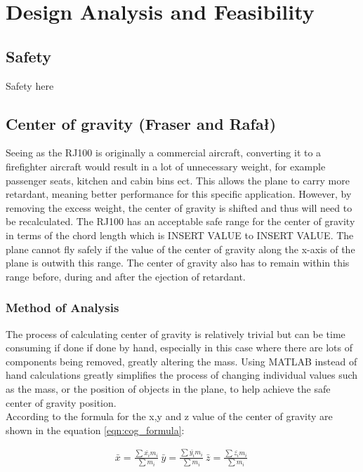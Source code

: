 \chapter{Design Analysis and Feasibility}
\section{Safety}
Safety here



\section{Center of gravity (Fraser and Rafał)}

Seeing as the RJ100 is originally a commercial aircraft, converting it to a firefighter aircraft would result in a lot of unnecessary weight, 
for example passenger seats, kitchen and cabin bins ect.
This allows the plane to carry more retardant, meaning better performance for this specific application.
However, by removing the excess weight, the center of gravity is shifted and thus will need to be recalculated.
The RJ100 has an acceptable safe range for the center of gravity in terms of the chord length which is INSERT VALUE to INSERT VALUE.
The plane cannot fly safely if the value of the center of gravity along the x-axis of the plane is outwith this range.
The center of gravity also has to remain within this range before, during and after the ejection of retardant.

\subsection{Method of Analysis}
The process of calculating center of gravity is relatively trivial but can be time consuming if done if done by hand,
especially in this case where there are lots of components being removed, greatly altering the mass.
Using MATLAB instead of hand calculations greatly simplifies the process of changing individual values such as the mass, or the position of objects in the plane, to help achieve the safe center of gravity position. \\ 

According to \cite{baker2020engineering} the formula for the x,y and z value of the center of gravity are shown in the equation \ref{eqn:cog_formula}:

\begin{equation}
\begin{split}
  \bar{x} = \frac{\sum{ \bar{x_{i}} m_{i} }}{ \sum{ m_{i}}} \
  \bar{y} = \frac{\sum{ \bar{y_{i}} m_{i} }}{ \sum{ m_{i}}} \
  \bar{z} = \frac{\sum{ \bar{z_{i}} m_{i} }}{ \sum{ m_{i}}} \
\end{split}
\label{eqn:cog_formula}
\end{equation}

